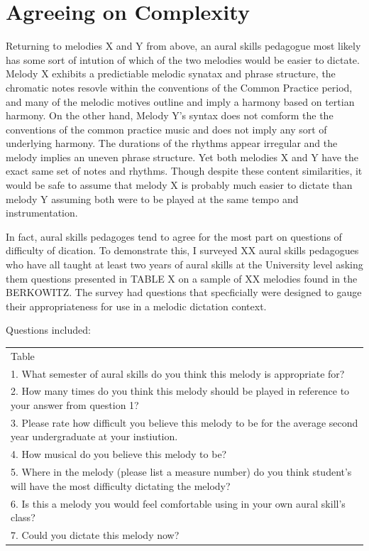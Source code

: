 \documentclass[]{book}
\begin{document}
\hypertarget{agreeing-on-complexity}{%
\section{Agreeing on Complexity}\label{agreeing-on-complexity}}

Returning to melodies X and Y from above, an aural skills pedagogue most likely has some sort of intution of which of the two melodies would be easier to dictate.
Melody X exhibits a predictiable melodic synatax and phrase structure, the chromatic notes resovle within the conventions of the Common Practice period, and many of the melodic motives outline and imply a harmony based on tertian harmony.
On the other hand, Melody Y's syntax does not comform the the conventions of the common practice music and does not imply any sort of underlying harmony.
The durations of the rhythms appear irregular and the melody implies an uneven phrase structure.
Yet both melodies X and Y have the exact same set of notes and rhythms.
Though despite these content similarities, it would be safe to assume that melody X is probably much easier to dictate than melody Y assuming both were to be played at the same tempo and instrumentation.

In fact, aural skills pedagoges tend to agree for the most part on questions of difficulty of dication.
To demonstrate this, I surveyed XX aural skills pedagogues who have all taught at least two years of aural skills at the University level asking them questions presented in TABLE X on a sample of XX melodies found in the BERKOWITZ.
The survey had questions that specficially were designed to gauge their appropriateness for use in a melodic dictation context.

Questions included:

\begin{longtable}[]{@{}l@{}}
\toprule
\endhead
Table\tabularnewline
1. What semester of aural skills do you think this melody is appropriate for?\tabularnewline
2. How many times do you think this melody should be played in reference to your answer from question 1?\tabularnewline
3. Please rate how difficult you believe this melody to be for the average second year undergraduate at your instiution.\tabularnewline
4. How musical do you believe this melody to be?\tabularnewline
5. Where in the melody (please list a measure number) do you think student's will have the most difficulty dictating the melody?\tabularnewline
6. Is this a melody you would feel comfortable using in your own aural skill's class?\tabularnewline
7. Could you dictate this melody now?\tabularnewline
\bottomrule
\end{longtable}
\end{document}
